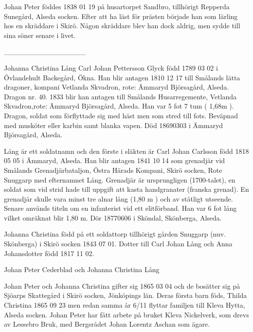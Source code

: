Johan Peter föddes 1838 01 19 på husartorpet Sandbro, tillhörigt Repperda Sunegård, Alseda socken.
Efter att ha läst för prästen började han som lärling hos en skräddare i Skirö. Någon skräddare blev han dock aldrig, men sydde till sina söner senare i livet.






________________


Johanna Christina Lång
Carl Johan Pettersson  Glyck född 1789 03 02 i Övlandehult Backegård, Ökna.
Han blir antagen 1810 12 17 till Smålands lätta dragoner, kompani Vetlanda Skvadron, rote: Ämmaryd Björsagård, Alseda. Dragon nr. 40.
1833 blir han antagen till Smålands Husarregemente, Vetlanda Skvadron,rote: Ämmaryd Björsagård, Alseda. Han var 5 fot 7 tum ( 1,68m ).
Dragon, soldat som förflyttade sig med häst men som stred till fots. Beväpnad med musköter eller karbin samt blanka vapen.
Död 18690303 i Ämmaryd Björsagård, Alseda.




Lång är ett soldatnamn och den förste i släkten är Carl Johan Carlsson född 1818 05 05 i Ämmaryd, Alseda. Han blir antagen 1841 10 14 som grenadjär vid Smålands Grenadjärbataljon, Östra Härads Kompani, Skirö socken, Rote Snuggarp med efternamnet Lång. Grenadjär är ursprungligen (1700-talet), en soldat som vid strid hade till uppgift att kasta handgranater (franska grenad). En grenadjär skulle vara minst tre alnar lång (1,80 m ) och av ståtligt utseende. Senare används titeln om en infanterist vid ett elitförband.
Han var 6 fot lång vilket omräknat blir 1,80 m.
Dör 18770606 i Sköndal, Skönberga, Alseda.








Johanna Christina född på ett soldattorp tillhörigt gården Snuggarp (nuv. Skönberga) i Skirö socken 1843 07 01. Dotter till Carl Johan Lång och Anna Johansdotter född 1817 11 02. 




Johan Peter Cederblad och Johanna Christina Lång


Johan Peter och Johanna Christina gifter sig 1865 03 04 och de bosätter sig på Sjöarps Skattegård i Skirö socken, Jönköpings län. Deras första barn föds, Thilda Christina 1865 09 23 men redan samma år 6/11 flyttar familjen till Kleva Hytta, Alseda socken. Johan Peter har fått arbete på bruket Kleva Nickelverk, som drevs av Lessebro Bruk, med Bergsrådet Johan Lorentz Aschan som ägare. 




